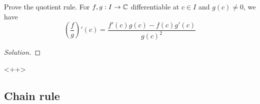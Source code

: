 \begin{exercise}
  Prove the quotient rule. For $f,g:I\to\mathbb C$ differentiable at $c\in I$ and $g(c)\neq 0$,
  we have 
  \[(\frac{f}{g})'(c) = \frac{f'(c)g(c) - f(c)g'(c)}{g(c)^2}\]
\end{exercise}
\begin{proof}[Solution]
  
\end{proof}<++>

\subsection{Chain rule}
